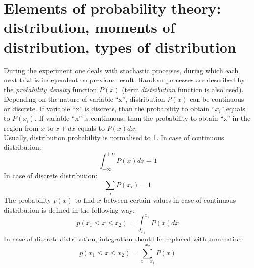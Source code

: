\documentclass[12pt,a4paper]{report}
\begin{document}
\section{Elements of probability theory: distribution, moments of distribution, types of distribution}
During the experiment one deals with stochastic processes, during which each next trial is independent on previous result. Random processes are described by the \textit{probability density} function $P(x)$ (term \textit{distribution} function is also used). Depending on the nature of variable \enquote{x}, distribution $P(x)$ can be continuous or discrete. If variable \enquote{x} is discrete, than the probability to obtain \enquote{$x_i$} equals to $P(x_i)$. If variable \enquote{x} is continuous, than the probability to obtain \enquote{x} in the region from $x$ to $x+dx$ equals to $P(x)dx$. \\
Usually, distribution probability is normalised to 1. In case of continuous distribution:
\begin{equation} \label{norm_P_1}
\int_{-\infty}^{+\infty} P(x)dx = 1
\end{equation}
In case of discrete distribution:
\begin{equation} \label{norm_P_2}
\sum_{i} P(x_i) = 1
\end{equation}
The probability $p(x)$ to find $x$ between certain values in case of continuous distribution is defined in the following way:
\begin{equation} \label{prob_find_1}
p(x_1 \leq x \leq x_2) = \int_{x_1}^{x_2} P(x)dx
\end{equation}
In case of discrete distribution, integration should be replaced with summation:
\begin{equation} \label{prob_find_2}
p(x_1 \leq x \leq x_2) = \sum_{x = x_1}^{x_2} P(x)
\end{equation}
\end{document}
